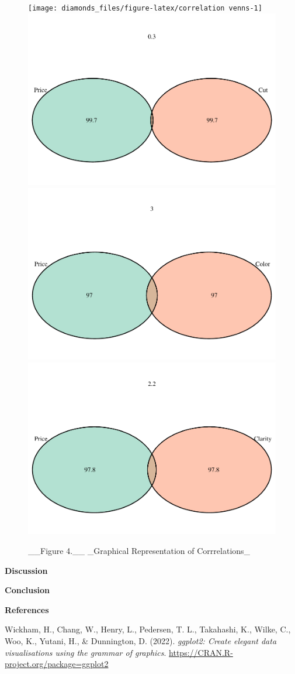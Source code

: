 \documentclass[
]{article}
\newlength{\cslhangindent}
\newlength{\cslentryspacingunit} %
\newenvironment{CSLReferences}[2] %
 {%
  \setlength{\parindent}{0pt}
  \ifodd #1
  \let\oldpar\par
  \def\par{\hangindent=\cslhangindent\oldpar}
  \fi
  \setlength{\parskip}{#2\cslentryspacingunit}
 }%
 {}
\begin{document}
\begin{figure}

{\centering \texttt{[image: diamonds\_files/figure-latex/correlation venns-1]} \includegraphics[width=0.5\linewidth]{diamonds_files/figure-latex/correlation venns-2} \includegraphics[width=0.5\linewidth]{diamonds_files/figure-latex/correlation venns-3} \includegraphics[width=0.5\linewidth]{diamonds_files/figure-latex/correlation venns-4} 

}

\caption{__Figure 4.__ _Graphical Representation of Corrrelations_}\label{fig:correlation venns}
\end{figure}

\hfill\break
\textbf{Discussion}

\hfill\break
\textbf{Conclusion}

\textbf{References}

\hypertarget{refs}{}
\begin{CSLReferences}{1}{0}
\leavevmode{}%
Wickham, H., Chang, W., Henry, L., Pedersen, T. L., Takahashi, K.,
Wilke, C., Woo, K., Yutani, H., \& Dunnington, D. (2022). \emph{ggplot2:
Create elegant data visualisations using the grammar of graphics}.
\url{https://CRAN.R-project.org/package=ggplot2}

\end{CSLReferences}

\hfill\break
\end{document}
